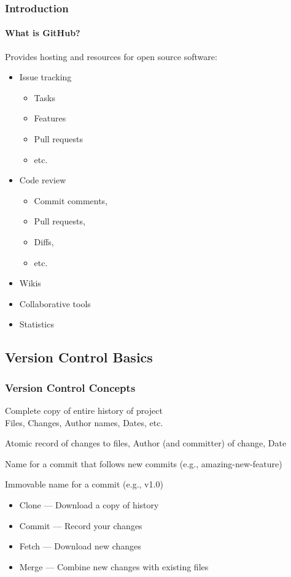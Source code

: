 \documentclass{beamer}
\begin{document}
\begin{frame}
 \frametitle{Introduction}
 \framesubtitle{What is GitHub?}

 Provides hosting and resources for open source software:
 \begin{itemize}
  \item Issue tracking
   \begin{itemize}
    \item Tasks
    \item Features
    \item Pull requests
    \item etc.
   \end{itemize}
  \item Code review
   \begin{itemize}
    \item Commit comments,
    \item Pull requests,
    \item Diffs,
    \item etc.
   \end{itemize}
  \item Wikis
  \item Collaborative tools
  \item Statistics
 \end{itemize}
\end{frame}

\subsection{Version Control Basics}

\begin{frame}
 \frametitle{Version Control Concepts}

 \begin{description}[Operations]
  \item[Repository] Complete copy of entire history of project\\
                    Files, Changes, Author names, Dates, etc.
  \item[Commit] Atomic record of changes to files, Author (and committer) of
                change, Date
  \item[Branch] Name for a commit that follows new commits (e.g.,
                amazing-new-feature)
  \item[Tag] Immovable name for a commit (e.g., v1.0)
  \item[Operations]
   \begin{itemize}
    \item Clone --- Download a copy of history
    \item Commit --- Record your changes
    \item Fetch --- Download new changes
    \item Merge --- Combine new changes with existing files
   \end{itemize}
 \end{description}
\end{frame}
\end{document}
